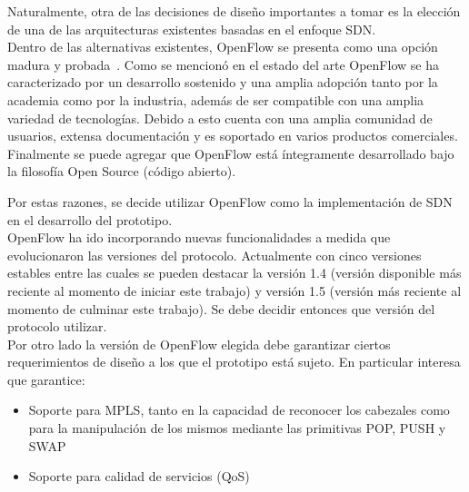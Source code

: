 Naturalmente, otra de las decisiones de dise\~no importantes a tomar es la elecci\'on de una de las arquitecturas existentes basadas en el enfoque SDN.\\
  
Dentro de las alternativas existentes, OpenFlow se presenta como una opci\'on madura y probada~\citep{Ofelia}. Como se mencion\'o en el estado del arte OpenFlow  se ha caracterizado por un desarrollo sostenido y una amplia adopci\'on tanto por la academia como por la industria, adem\'as de ser compatible con una amplia variedad de tecnolog\'ias. Debido a esto cuenta con una amplia comunidad de usuarios, extensa documentaci\'on y es soportado en varios productos comerciales\citep{Pica8}\citep{HP}\citep{Centec}\citep{SDNProductlist}. Finalmente se puede agregar que OpenFlow est\'a íntegramente desarrollado bajo la filosof\'ia Open Source (c\'odigo abierto). 

Por estas razones, se decide utilizar OpenFlow como la implementaci\'on de SDN en el desarrollo del prototipo.\\






OpenFlow ha ido incorporando nuevas funcionalidades a medida que evolucionaron las versiones del protocolo. Actualmente con cinco versiones estables entre las cuales se pueden destacar la versi\'on 1.4 (versi\'on disponible m\'as reciente al momento de iniciar este trabajo) y versi\'on 1.5 (versi\'on m\'as reciente al momento de culminar este trabajo). Se debe decidir entonces que versi\'on del protocolo utilizar.\\

Por otro lado la versi\'on de OpenFlow elegida debe garantizar ciertos requerimientos de dise\~no a los que el prototipo est\'a sujeto. En particular interesa que garantice:

\begin{itemize}
\item Soporte para MPLS, tanto en la capacidad de reconocer los cabezales como para la manipulaci\'on de los mismos mediante las primitivas POP, PUSH y SWAP
\item Soporte para calidad de servicios (QoS)
\end{itemize}

